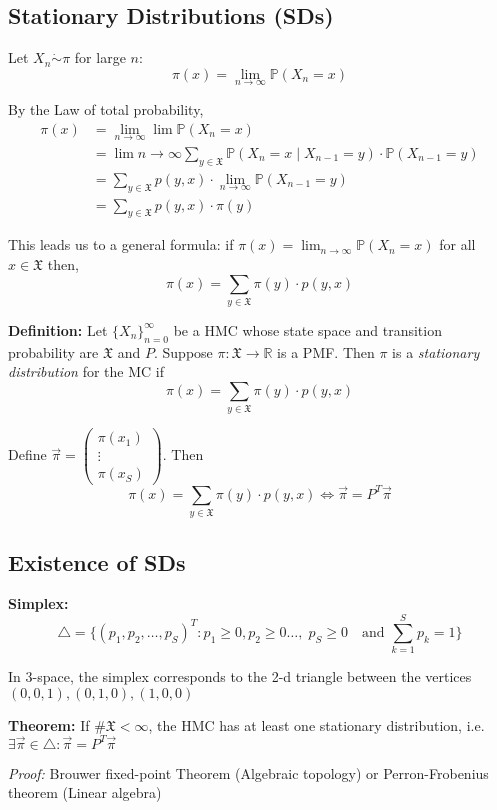 \documentclass[12pt]{article}
\renewcommand{\P}{\mathbb{P}}
\newcommand{\R}{\mathbb{R}}
\newcommand{\mfX}{\mathfrak{X}}
\begin{document}
\subsection{Stationary Distributions (SDs)}
Let $X_n \dot \sim \pi$ for large $n$: 
\[\pi(x) = \lim_{n\to \infty} \P(X_n = x)\]

By the Law of total probability, 
\begin{align*}
    \pi(x) &= \lim_{n\to \infty} \lim\P(X_n = x)\\
    &= \lim{n\to \infty} \sum_{y \in \mfX} \P(X_n = x \; | \; X_{n-1} = y) \cdot \P(X_{n-1} = y)\\
    &= \sum_{y \in \mfX} p(y, x) \cdot \lim_{n\to \infty} \P(X_{n-1} = y)\\
    &= \sum_{y \in \mfX} p(y, x) \cdot \pi(y)
\end{align*}

This leads us to a general formula: if $\pi(x) = \lim_{n\to\infty} \P(X_n = x)$ for all $x \in \mfX$ then, 
\[\pi(x) = \sum_{y\in \mfX} \pi(y) \cdot p(y, x)\]

\textbf{Definition:} Let $\{X_n\}_{n=0}^\infty$ be a HMC whose state space and transition probability are $\mfX$ and $P$. Suppose $\pi: \mfX \to \R$ is a PMF. Then $\pi$ is a \emph{stationary distribution} for the MC if 
\[\pi(x) = \sum_{y\in \mfX} \pi(y) \cdot p(y, x)\]

Define $\vec \pi = \begin{pmatrix}
    \pi(x_1)\\
    \vdots\\
    \pi(x_S)
\end{pmatrix}$. Then 
\[\pi(x) = \sum_{y\in \mfX} \pi(y) \cdot p(y, x) \iff \vec \pi = P^T \vec \pi\] 

\subsection{Existence of SDs}
\textbf{Simplex:}
\[\triangle = \{(p_1, p_2, \dots, p_S)^T : p_1 \geq 0, p_2 \geq 0 \dots,\; p_S \geq 0 \quad \text{and } \sum_{k=1}^S p_k = 1\}\]

In $3$-space, the simplex corresponds to the 2-d triangle between the vertices $(0, 0, 1), (0, 1, 0), (1, 0, 0)$

\textbf{Theorem:} If $\#\mfX < \infty$, the HMC has at least one stationary distribution, i.e. $\exists \vec \pi \in \triangle : \vec \pi = P^T \vec \pi$

    \emph{Proof:} Brouwer fixed-point Theorem (Algebraic topology) or Perron-Frobenius theorem (Linear algebra)
\end{document}
